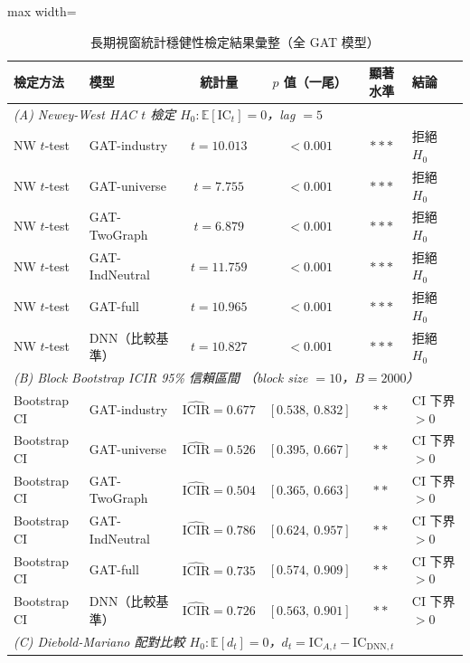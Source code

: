 \begin{table}[H]
\centering
\caption{長期視窗統計穩健性檢定結果彙整（全 GAT 模型）}
\label{tab:results_stat_tests}
\begingroup
\scriptsize
\setlength{\tabcolsep}{4pt}
\renewcommand{\arraystretch}{1.10}
\begin{adjustbox}{max width=\textwidth}
\begin{tabular}{@{}llcccl@{}}
\toprule
檢定方法 & 模型 & 統計量 & $p$ 值（一尾） & 顯著水準 & 結論 \\
\midrule
\multicolumn{6}{l}{\textit{(A) Newey-West HAC $t$ 檢定 \quad $H_0: \mathbb{E}[\mathrm{IC}_t] = 0$，lag $= 5$}} \\[2pt]
NW $t$-test & GAT-industry    & $t = 10.013$ & $< 0.001$ & $***$ & 拒絕 $H_0$ \\
NW $t$-test & GAT-universe    & $t =  7.755$ & $< 0.001$ & $***$ & 拒絕 $H_0$ \\
NW $t$-test & GAT-TwoGraph    & $t =  6.879$ & $< 0.001$ & $***$ & 拒絕 $H_0$ \\
NW $t$-test & GAT-IndNeutral  & $t = 11.759$ & $< 0.001$ & $***$ & 拒絕 $H_0$ \\
NW $t$-test & GAT-full        & $t = 10.965$ & $< 0.001$ & $***$ & 拒絕 $H_0$ \\
NW $t$-test & DNN（比較基準） & $t = 10.827$ & $< 0.001$ & $***$ & 拒絕 $H_0$ \\[4pt]
\multicolumn{6}{l}{\textit{(B) Block Bootstrap ICIR 95\% 信賴區間 \quad（block size $= 10$，$B = 2000$）}} \\[2pt]
Bootstrap CI & GAT-industry    & $\widehat{\mathrm{ICIR}} = 0.677$ & $[0.538,\ 0.832]$ & $**$ & CI 下界 $> 0$ \\
Bootstrap CI & GAT-universe    & $\widehat{\mathrm{ICIR}} = 0.526$ & $[0.395,\ 0.667]$ & $**$ & CI 下界 $> 0$ \\
Bootstrap CI & GAT-TwoGraph    & $\widehat{\mathrm{ICIR}} = 0.504$ & $[0.365,\ 0.663]$ & $**$ & CI 下界 $> 0$ \\
Bootstrap CI & GAT-IndNeutral  & $\widehat{\mathrm{ICIR}} = 0.786$ & $[0.624,\ 0.957]$ & $**$ & CI 下界 $> 0$ \\
Bootstrap CI & GAT-full        & $\widehat{\mathrm{ICIR}} = 0.735$ & $[0.574,\ 0.909]$ & $**$ & CI 下界 $> 0$ \\
Bootstrap CI & DNN（比較基準） & $\widehat{\mathrm{ICIR}} = 0.726$ & $[0.563,\ 0.901]$ & $**$ & CI 下界 $> 0$ \\[4pt]
\multicolumn{6}{l}{\textit{(C) Diebold-Mariano 配對比較 \quad $H_0: \mathbb{E}[d_t] = 0$，$d_t = \mathrm{IC}_{A,t} - \mathrm{IC}_{\mathrm{DNN},t}$}} \\[2pt]

\end{tabular}
\end{adjustbox}
\end{table}
